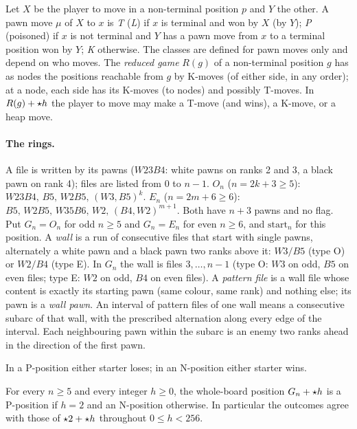 \begin{wallproof}
Let $X$ be the player to move in a non-terminal position $p$ and $Y$ the other. A pawn move $\mu$ of $X$ to $x$ is \emph{T} (\emph{L}) if
$x$ is terminal and won by $X$ (by $Y$); \emph{P} (poisoned) if $x$ is not terminal and $Y$ has a pawn move from $x$ to a terminal
position won by $Y$; \emph{K} otherwise. The classes are defined for pawn moves only and depend on who moves. The \emph{reduced game}
$R(g)$ of a non-terminal position $g$ has as nodes the positions reachable from $g$ by K-moves (of either side, in any order); at a node,
each side has its K-moves (to nodes) and possibly T-moves. In $R(g)+\mathord{\star h}$ the player to move may make a T-move (and wins), a K-move,
or a heap move.

\paragraph{The rings.}
A file is written by its pawns ($W23B4$: white pawns on ranks 2 and 3, a black pawn on rank 4); files are listed from $0$ to $n-1$.
$O_n$ ($n=2k+3\ge5$): $W23B4,\,B5,\,W2B5,\,(W3,B5)^k$.\quad
$E_n$ ($n=2m+6\ge6$): $B5,\,W2B5,\,W35B6,\,W2,\,(B4,W2)^{m+1}$. Both have $n+3$ pawns and no flag.
Put $G_n=O_n$ for odd $n\ge5$ and $G_n=E_n$ for even $n\ge6$, and $\mathrm{start}_n$ for this position.
A \emph{wall} is a run of consecutive files that start with single pawns, alternately a white pawn and a black pawn two ranks above it:
$W3/B5$ (type O) or $W2/B4$ (type E). In $G_n$ the wall is files $3,\dots,n-1$ (type O: $W3$ on odd, $B5$ on even files; type E: $W2$ on
odd, $B4$ on even files). A \emph{pattern file} is a wall file whose content is exactly its starting pawn (same colour, same rank) and
nothing else; its pawn is a \emph{wall pawn}. An interval of pattern files of one wall means a consecutive subarc of that wall, with the prescribed alternation along every edge of the interval. Each neighbouring pawn within the subarc is an enemy two ranks ahead in the direction of the first pawn.

In a P-position either starter loses; in an N-position either starter wins.

\begin{theorem}
For every $n\ge5$ and every integer $h\ge0$, the whole-board position $G_n+\mathord{\star h}$ is a P-position if $h=2$ and an N-position
otherwise. In particular the outcomes agree with those of $\mathord{\star2}+\mathord{\star h}$ throughout $0\le h<256$.
\end{theorem}


\end{wallproof}
